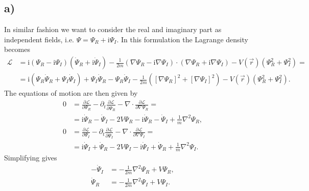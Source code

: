 \documentclass[english, parskip=full]{scrartcl}
\newcommand{\kla}{}
\renewcommand{\i}{\text{i}}
\begin{document}
\subsection*{a)}
In similar fashion we want to consider the real and imaginary part as independent fields, i.e. $\Psi = \Psi_R + \i\Psi_I$.
In this formulation the Lagrange density becomes
\begin{align}
\mathcal{L} &=  \i (\Psi_R - \i\Psi_I) (\dot{\Psi}_R + \i \dot{\Psi}_I) - \frac{1}{2m} (\nabla\Psi_R - \i\nabla\Psi_I) \cdot (\nabla\Psi_R + \i\nabla\Psi_I) - V(\vec{r}) (\Psi_R^2 + \Psi_I^2) = \\
&= \i (\Psi_R\dot{\Psi}_R + \Psi_I\dot{\Psi}_I) + \Psi_I\dot{\Psi}_R - \Psi_R\dot{\Psi}_I - \frac{1}{2m} \kla\left( {[\nabla\Psi_R]^2 + [\nabla\Psi_I]^2} \right) - V(\vec{r}) (\Psi_R^2 + \Psi_I^2).
\end{align}
The equations of motion are then given by
\begin{align}
0 &= \frac{\partial\mathcal{L}}{\partial\Psi_R} - \partial_t \frac{\partial\mathcal{L}}{\partial \dot{\Psi}_R} - \nabla \cdot \frac{\partial\mathcal{L}}{\partial \nabla\Psi_R} = \\
&= \i\dot{\Psi}_R  - \dot{\Psi}_I - 2V\Psi_R - \i\dot{\Psi}_R - \dot{\Psi}_I + \frac{1}{m}\nabla^2\Psi_R,\\
0 &= \frac{\partial\mathcal{L}}{\partial\Psi_I} - \partial_t \frac{\partial\mathcal{L}}{\partial \dot{\Psi}_I} - \nabla \cdot \frac{\partial\mathcal{L}}{\partial \nabla\Psi_I} = \\
&= \i\dot{\Psi}_I + \dot{\Psi}_R - 2V\Psi_I - \i\dot{\Psi}_I + \dot{\Psi}_R + \frac{1}{m}\nabla^2\Psi_I.
\end{align}
Simplifying gives
\begin{align}
-\dot{\Psi}_I &= -\frac{1}{2m}\nabla^2\Psi_R + V\Psi_R,\\
\dot{\Psi}_R &= -\frac{1}{2m}\nabla^2\Psi_I + V\Psi_I.
\end{align}
\end{document}
